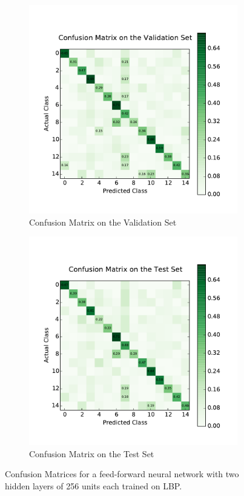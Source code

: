 \begin{figure}[H]
	\centering
	\begin{subfigure}[b]{0.45\linewidth}
		\centering
		\includegraphics[width=\linewidth]{images/0/cm_valid.pdf}
		\caption{Confusion Matrix on the Validation Set}
	\end{subfigure}
	\hfill
	\begin{subfigure}[b]{0.45\linewidth}
		\centering
		\includegraphics[width=\linewidth]{images/0/cm_test.pdf}
		\caption{Confusion Matrix on the Test Set}
	\end{subfigure}
	\caption{Confusion Matrices for a feed-forward neural network with two hidden layers of 256 units each trained on LBP.}
	\label{shrine0_mat}
\end{figure}
